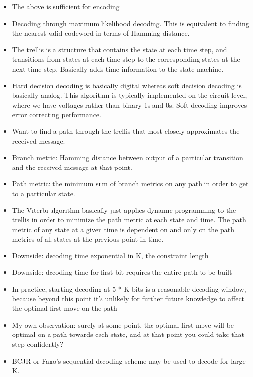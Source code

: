 \documentclass{article}
\begin{document}
\begin{itemize}
\item The above is sufficient for encoding

\item Decoding through maximum likelihood decoding. This is equivalent to
finding the nearest valid codeword in terms of Hamming distance.

\item The trellis is a structure that contains the state at each time step,
and transitions from states at each time step to the corresponding states
at the next time step. Basically adds time information to the state
machine.

\item Hard decision decoding is basically digital whereas soft decision decoding
is basically analog. This algorithm is typically implemented on the
circuit level, where we have voltages rather than binary 1s and 0s. Soft
decoding improves error correcting performance.

\item Want to find a path through the trellis that most closely approximates the
received message.

\item Branch metric: Hamming distance between output of a particular transition
and the received message at that point.

\item Path metric: the minimum sum of branch metrics on any path in order to get
to a particular state.

\item The Viterbi algorithm basically just applies dynamic programming to the
trellis in order to minimize the path metric at each state and time. The
path metric of any state at a given time is dependent on and only on the
path metrics of all states at the previous point in time.

\item Downside: decoding time exponential in K, the constraint length

\item Downside: decoding time for first bit requires the entire path to be built

\item In practice, starting decoding at 5 * K bits is a reasonable decoding
window, because beyond this point it's unlikely for further future
knowledge to affect the optimal first move on the path

\item My own observation: surely at some point, the optimal first move will be
optimal on a path towards each state, and at that point you could take
that step confidently?

\item BCJR or Fano's sequential decoding scheme may be used to decode for large
K.
\end{itemize}
\end{document}
